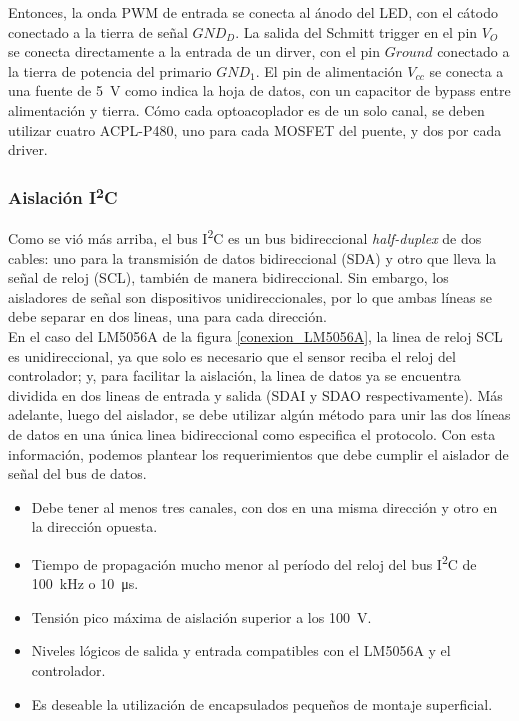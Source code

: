 Entonces, la onda PWM de entrada se conecta al ánodo del LED, con el cátodo conectado a la tierra de señal $GND_D$. La salida del Schmitt trigger en el pin $V_O$ se conecta directamente a la entrada de un dirver, con el pin $Ground$ conectado a la tierra de potencia del primario $GND_1$. El pin de alimentación $V_{cc}$ se conecta a una fuente de \SI[]{5}[]{\volt} como indica la hoja de datos, con un capacitor de bypass entre alimentación y tierra. Cómo cada optoacoplador es de un solo canal, se deben utilizar cuatro ACPL-P480, uno para cada MOSFET del puente, y dos por cada driver.\\

\subsubsection{Aislación I\textsuperscript{2}C}

Como se vió más arriba, el bus I\textsuperscript{2}C es un bus bidireccional \textit{half-duplex} de dos cables: uno para la transmisión de datos bidireccional (SDA) y otro que lleva la señal de reloj (SCL), también de manera bidireccional. Sin embargo, los aisladores de señal son dispositivos unidireccionales, por lo que ambas líneas  se debe separar en dos lineas, una para cada dirección.\\

En el caso del LM5056A de la figura \ref{conexion_LM5056A}, la linea de reloj SCL es unidireccional, ya que solo es necesario que el sensor reciba el reloj del controlador; y, para facilitar la aislación, la linea de datos ya se encuentra dividida en dos lineas de entrada y salida (SDAI y SDAO respectivamente). Más adelante, luego del aislador, se debe utilizar algún método para unir las dos líneas de datos en una única linea bidireccional como especifica el protocolo. Con esta información, podemos plantear los requerimientos que debe cumplir el aislador de señal del bus de datos.\\

\begin{itemize}
    \item Debe tener al menos tres canales, con dos en una misma dirección y otro en la dirección opuesta.
    \item Tiempo de propagación mucho menor al período del reloj del bus I\textsuperscript{2}C de \SI[]{100}[]{\kilo\hertz} o \SI[]{10}[]{\micro\second}.
    \item Tensión pico máxima de aislación superior a los \SI[]{100}[]{\volt}.
    \item Niveles lógicos de salida y entrada compatibles con el LM5056A y el controlador.
    \item Es deseable la utilización de encapsulados pequeños de montaje superficial.\\
\end{itemize}

